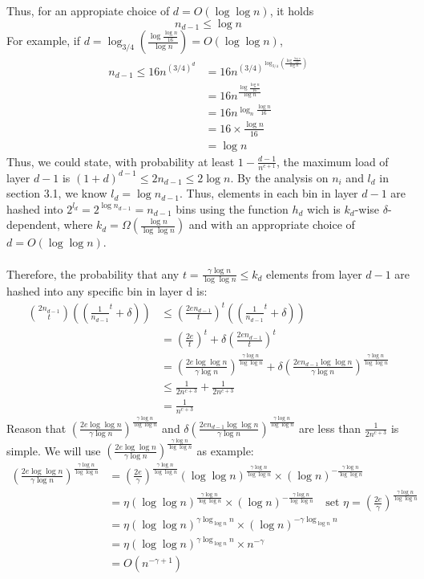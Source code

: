 \documentclass[a4paper, english]{paper}
\begin{document}
Thus, for an appropiate choice of $d = O(\log\log n)$, it holds $$n_{d-1}\le \log n$$
For example, if $d = \log_{3/4}\left( \frac{\log \frac{\log n}{16}}{\log n}\right)=O(\log\log n)$,
\begin{align*}
n_{d-1}\le16n^{(3/4)^d}&=16n^{(3/4)^{\log_{3/4}\left( \frac{\log \frac{\log n}{16}}{\log n}\right)}}\\
&= 16n^{\frac{\log \frac{\log n}{16}}{\log n}}\\
&= 16n^{\log_n \frac{\log n}{16}}\\
&= 16\times\frac{\log n}{16}\\
&= \log n
\end{align*}
Thus, we could state, with probability at least $1-\frac{d-1}{n^{c+1}}$, the maximum load of layer $d-1$ is $(1+d)^{d-1}\le2n_{d-1}\le2\log n$. By the analysis on $n_i$ and $l_d$ in section 3.1, we know $l_d = \log n_{d-1}$. Thus, elements in each bin in layer $d-1$ are hashed into $2^{l_d} = 2^{\log n_{d-1}} = n_{d-1}$ bins using the function $h_d$ wich is $k_d$-wise $\delta$-dependent, where $k_d=\Omega(\frac{\log n}{\log\log n})$ and with an appropriate choice of $d=O(\log\log n)$.\\\\
Therefore, the probability that any $t = \frac{\gamma\log n}{\log \log n}\le k_d$ elements from layer $d-1$ are hashed into any specific bin in layer d is:
\begin{align*}
{2n_{d-1}\choose t} \left((\frac1{n_{d-1}}^t+\delta)\right)&\le (\frac{2en_{d-1}}{t})^t\left((\frac1{n_{d-1}}^t+\delta)\right)\\
& = (\frac{2e}t)^t+\delta\left( \frac{2en_{d-1}}{t}\right)^t\\
& = (\frac{2e\log\log n}{\gamma\log n})^{\frac{\gamma\log n}{\log \log n}}+\delta\left( \frac{2en_{d-1}\log\log n}{\gamma\log n}\right)^{\frac{\gamma\log n}{\log \log n}}\\
& \le \frac1{2n^{c+3}}+\frac1{2n^{c+3}}\\
& = \frac1{n^{c+3}}
\end{align*}
Reason that $(\frac{2e\log\log n}{\gamma\log n})^{\frac{\gamma\log n}{\log \log n}}$ and $\delta\left( \frac{2en_{d-1}\log\log n}{\gamma\log n}\right)^{\frac{\gamma\log n}{\log \log n}}$ are less than $\frac1{2n^{c+3}}$ is simple. We will use $(\frac{2e\log\log n}{\gamma\log n})^{\frac{\gamma\log n}{\log \log n}}$ as example:
\begin{align*}
(\frac{2e\log\log n}{\gamma\log n})^{\frac{\gamma\log n}{\log \log n}} &= (\frac{2e}{\gamma})^{\frac{\gamma\log n}{\log \log n}}(\log\log n)^{\frac{\gamma\log n}{\log \log n}}\times(\log n)^{-\frac{\gamma\log n}{\log \log n}}\\
&= \eta(\log\log n)^{\frac{\gamma\log n}{\log \log n}}\times(\log n)^{-\frac{\gamma\log n}{\log \log n}}\quad\text{set }\eta=(\frac{2e}{\gamma})^{\frac{\gamma\log n}{\log \log n}}\\
&=\eta (\log\log n)^{\gamma\log_{\log n} n}\times(\log n)^{-\gamma\log_{\log n} n}\\
&= \eta (\log\log n)^{\gamma\log_{\log n} n}\times n^{-\gamma}\\
&= O(n^{-\gamma+1})
\end{align*}
\end{document}

